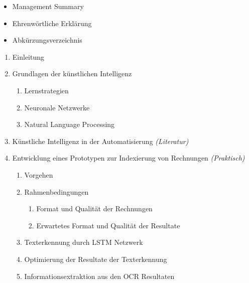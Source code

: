 \documentclass{hwz}
\begin{document}
{
    \renewcommand\labelitemi{--}
    \renewcommand{\labelenumi}{\arabic{enumi}}
    \renewcommand{\labelenumii}{\labelenumi.\arabic{enumii}}
    \renewcommand{\labelenumiii}{\labelenumii.\arabic{enumiii}}
    \begin{itemize}[topsep=0pt,itemsep=2pt,partopsep=4pt, parsep=4pt]
        \item Management Summary
        \item Ehrenwörtliche Erklärung
        \item Abkürzungsverzeichnis
    \end{itemize}
    \begin{enumerate}[topsep=0pt,itemsep=2pt,partopsep=4pt, parsep=4pt]
        \item Einleitung
        \item Grundlagen der künstlichen Intelligenz
        \begin{enumerate}[topsep=0pt,itemsep=2pt,partopsep=4pt, parsep=4pt]
            \item Lernstrategien
            \item Neuronale Netzwerke
            \item Natural Language Processing
        \end{enumerate}
        \item Künstliche Intelligenz in der Automatisierung \textit{(Literatur)}
        \item Entwicklung eines Prototypen zur Indexierung von Rechnungen \textit{(Praktisch)}
        \begin{enumerate}[topsep=0pt,itemsep=2pt,partopsep=4pt, parsep=4pt]
            \item Vorgehen
            \item Rahmenbedingungen
            \begin{enumerate}[topsep=0pt,itemsep=2pt,partopsep=4pt, parsep=4pt]
                \item Format und Qualität der Rechnungen
                \item Erwartetes Format und Qualität der Resultate
            \end{enumerate}
            \item Texterkennung durch LSTM Netzwerk
            \item Optimierung der Resultate der Texterkennung
            \item Informationsextraktion aus den OCR Resultaten
            \begin{enumerate}[topsep=0pt,itemsep=2pt,partopsep=4pt, parsep=4pt]

\end{enumerate}
\end{enumerate}
\end{enumerate}}
\end{document}
